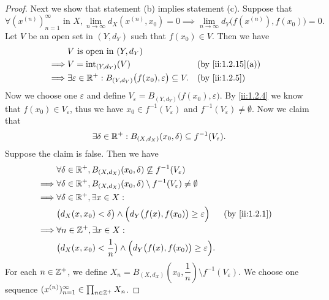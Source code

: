 \begin{proof}
  Next we show that statement (b) implies statement (c).
  Suppose that
  \[
    \forall (x^{(n)})_{n = 1}^\infty \text{ in } X, \lim_{n \to \infty} d_X(x^{(n)}, x_0) = 0 \implies \lim_{n \to \infty} d_Y\big(f(x^{(n)}), f(x_0)\big) = 0.
  \]
  Let \(V\) be an open set in \((Y, d_Y)\) such that \(f(x_0) \in V\).
  Then we have
  \begin{align*}
             & V \text{ is open in } (Y, d_Y)                                                                               \\
    \implies & V = \text{int}_{(Y, d_Y)}(V)                                                          &  & \by{ii:1.2.15}[a] \\
    \implies & \exists \varepsilon \in \R^+ : B_{(Y, d_Y)}\big(f(x_0), \varepsilon\big) \subseteq V. &  & \by{ii:1.2.5}
  \end{align*}
  Now we choose one \(\varepsilon\) and define \(V_\varepsilon = B_{(Y, d_Y)}\big(f(x_0), \varepsilon\big)\).
  By \cref{ii:1.2.4} we know that \(f(x_0) \in V_\varepsilon\), thus we have \(x_0 \in f^{-1}(V_\varepsilon)\) and \(f^{-1}(V_\varepsilon) \neq \emptyset\).
  Now we claim that
  \[
    \exists \delta \in \mathbb{R}^+ : B_{(X, d_X)}(x_0, \delta) \subseteq f^{-1}(V_\varepsilon).
  \]
  Suppose the claim is false.
  Then we have
  \begin{align*}
             & \forall \delta \in \R^+, B_{(X, d_X)}(x_0, \delta) \not\subseteq f^{-1}(V_\varepsilon)                               \\
    \implies & \forall \delta \in \R^+, B_{(X, d_X)}(x_0, \delta) \setminus f^{-1}(V_\varepsilon) \neq \emptyset                    \\
    \implies & \forall \delta \in \R^+, \exists x \in X :                                                                           \\
             & \big(d_X(x, x_0) < \delta\big) \land \Big(d_Y\big(f(x), f(x_0)\big) \geq \varepsilon\Big)         &  & \by{ii:1.2.1} \\
    \implies & \forall n \in \Z^+, \exists x \in X :                                                                                \\
             & \big(d_X(x, x_0) < \dfrac{1}{n}\big) \land \Big(d_Y\big(f(x), f(x_0)\big) \geq \varepsilon\Big).
  \end{align*}
  For each \(n \in \mathbb{Z}^+\), we define \(X_n = B_{(X, d_X)}(x_0, \dfrac{1}{n}) \setminus f^{-1}(V_\varepsilon)\).
  We choose one sequence \((x^{(n)})_{n = 1}^\infty \in \prod_{n \in \mathbb{Z}^+} X_n\).

\end{proof}
